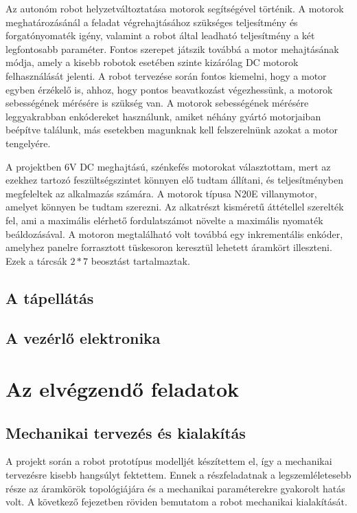
\medskip

Az autonóm robot helyzetváltoztatása motorok segítségével történik. A motorok
meghatározásánál a feladat végrehajtásához szükséges teljesítmény és
forgatónyomaték igény, valamint a robot által leadható teljesítmény a két
legfontosabb paraméter. Fontos szerepet játszik továbbá a motor mehajtásának
módja, amely a kisebb robotok esetében szinte kizárólag DC motorok felhasználását
jelenti. A robot tervezése során fontos kiemelni, hogy a motor egyben érzékelő
is, ahhoz, hogy pontos beavatkozást végezhessünk, a motorok sebességének mérésére
is szükség van. A motorok sebességének mérésére leggyakrabban enkódereket
használunk, amiket néhány gyártó motorjaiban beépítve találunk, más esetekben
magunknak kell felszerelnünk azokat a motor tengelyére.

A projektben 6V DC meghajtású, szénkefés motorokat választottam, mert az ezekhez
tartozó feszültségszintet könnyen elő tudtam állítani, és teljesítményben
megfeleltek az alkalmazás számára. A motorok típusa N20E villanymotor, amelyet
könnyen be tudtam szerezni. Az alkatrészt kisméretű áttétellel szerelték fel, ami
a maximális elérhető fordulatszámot növelte a maximális nyomaték beáldozásával. A
motoron megtalálható volt továbbá egy inkrementális enkóder, amelyhez panelre
forrasztott tüskesoron keresztül lehetett áramkört illeszteni. Ezek a tárcsák \(2
* 7\) beosztást tartalmaztak.


\subsection{A tápellátás}


\subsection{A vezérlő elektronika}


\section{Az elvégzendő feladatok}

\subsection{Mechanikai tervezés és kialakítás}

A projekt során a robot prototípus modelljét készítettem el, így a mechanikai
tervezésre kisebb hangsúlyt fektettem. Ennek a részfeladatnak a legszemléletesebb
része az áramkörök topológiájára és a mechanikai paraméterekre gyakorolt hatás
volt. A következő fejezetben röviden bemutatom a robot mechanikai kialakítását.

